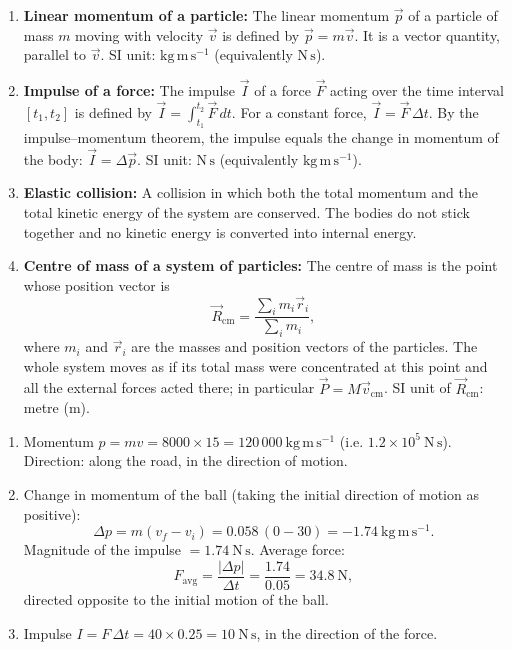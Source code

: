 \documentclass[11pt]{article}
\begin{document}
\begin{corrige}
\begin{enumerate}
\item \textbf{Linear momentum of a particle:} The linear momentum $\vec{p}$ of a particle of mass $m$ moving with velocity $\vec{v}$ is defined by $\vec{p} = m\vec{v}$. It is a vector quantity, parallel to $\vec{v}$. SI unit: $\mathrm{kg\,m\,s^{-1}}$ (equivalently $\mathrm{N\,s}$).

\item \textbf{Impulse of a force:} The impulse $\vec{I}$ of a force $\vec{F}$ acting over the time interval $[t_1,t_2]$ is defined by $\vec{I} = \displaystyle\int_{t_1}^{t_2} \vec{F}\,dt$. For a constant force, $\vec{I} = \vec{F}\,\Delta t$. By the impulse–momentum theorem, the impulse equals the change in momentum of the body: $\vec{I} = \Delta\vec{p}$. SI unit: $\mathrm{N\,s}$ (equivalently $\mathrm{kg\,m\,s^{-1}}$).

\item \textbf{Elastic collision:} A collision in which both the total momentum and the total kinetic energy of the system are conserved. The bodies do not stick together and no kinetic energy is converted into internal energy.

\item \textbf{Centre of mass of a system of particles:} The centre of mass is the point whose position vector is
\[ \vec{R}_{\mathrm{cm}} = \frac{\sum_i m_i \vec{r}_i}{\sum_i m_i}, \]
where $m_i$ and $\vec{r}_i$ are the masses and position vectors of the particles. The whole system moves as if its total mass were concentrated at this point and all the external forces acted there; in particular $\vec{P} = M\vec{v}_{\mathrm{cm}}$. SI unit of $\vec{R}_{\mathrm{cm}}$: metre ($\mathrm{m}$).
\end{enumerate}
\end{corrige}

\begin{corrige}
\begin{enumerate}
\item Momentum $p = mv = 8000 \times 15 = 120\,000\ \mathrm{kg\,m\,s^{-1}}$ (i.e. $1.2\times10^5\ \mathrm{N\,s}$). Direction: along the road, in the direction of motion.

\item Change in momentum of the ball (taking the initial direction of motion as positive):
\[ \Delta p = m(v_f - v_i) = 0.058\,(0 - 30) = -1.74\ \mathrm{kg\,m\,s^{-1}}. \]
Magnitude of the impulse $= 1.74\ \mathrm{N\,s}$. Average force:
\[ F_{\mathrm{avg}} = \frac{|\Delta p|}{\Delta t} = \frac{1.74}{0.05} = 34.8\ \mathrm{N}, \]
directed opposite to the initial motion of the ball.

\item Impulse $I = F\,\Delta t = 40 \times 0.25 = 10\ \mathrm{N\,s}$, in the direction of the force.
\end{enumerate}
\end{corrige}
\end{document}
